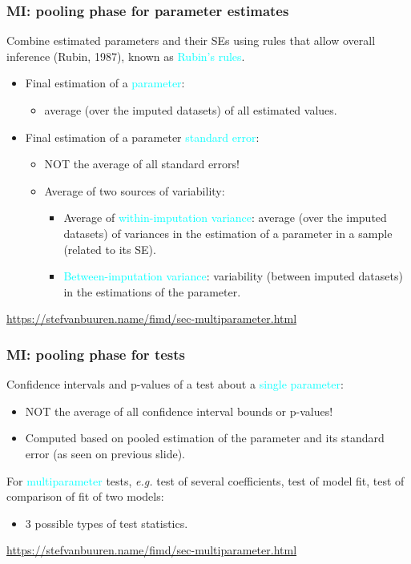 \documentclass{beamer}
\begin{document}
\begin{frame}
\frametitle{MI: pooling phase for parameter estimates}
Combine estimated parameters and their SEs using rules that allow overall inference (Rubin, 1987), known as \textcolor{cyan}{Rubin's rules}.
\begin{itemize}
\setlength\itemsep{0.3cm}
	\item Final estimation of a \textcolor{cyan}{parameter}: 
		\begin{itemize}
			\item average (over the imputed datasets) of all estimated values.
		\end{itemize}
	\item Final estimation of a parameter \textcolor{cyan}{standard error}: 
		\begin{itemize}
			\item NOT the average of all standard errors!
			\item Average of two sources of variability:
		
			\begin{itemize}
				\item Average of \textcolor{cyan}{within-imputation variance}: average (over the imputed datasets) of variances in the estimation of a parameter in a sample (related to its SE).
				\item \textcolor{cyan}{Between-imputation variance}: variability (between imputed datasets) in the estimations of the parameter.
			\end{itemize}
		\end{itemize}
\end{itemize}
\vfill
\footnotesize{\url{https://stefvanbuuren.name/fimd/sec-multiparameter.html}}
\end{frame}


\begin{frame}
\frametitle{MI: pooling phase for tests}

Confidence intervals and p-values of a test about a \textcolor{cyan}{single parameter}:
\begin{itemize}
	\item NOT the average of all confidence interval bounds or p-values!
	\item Computed based on pooled estimation of the parameter and its standard error (as seen on previous slide).
\end{itemize}	

\vspace{1cm}

For \textcolor{cyan}{multiparameter} tests, \textit{e.g.} test of several coefficients, test of model fit, test of comparison of fit of two models:  
\begin{itemize}
	\item 3 possible types of test statistics.
\end{itemize}	
\vfill
\footnotesize{\url{https://stefvanbuuren.name/fimd/sec-multiparameter.html}}
\end{frame}
\end{document}
